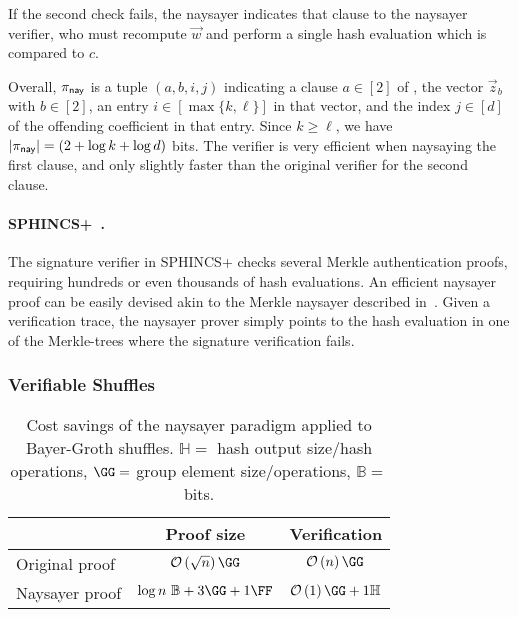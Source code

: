 If the second check fails, the naysayer indicates that clause to the naysayer verifier, who must recompute $\vec{w}$ and perform a single hash evaluation which is compared to $c$.

Overall, $\pi_{\mathsf{nay}}$ is a tuple $(a, b, i, j)$ indicating a clause $a \in [2]$ of , the vector $\vec{z}_b$ with $b \in [2]$, an entry $i \in [\max\{k,\ell\}]$ in that vector, and the index $j \in [d]$ of the offending coefficient in that entry. Since $k \geq \ell$, we have $\lvert \pi_{\mathsf{nay}} \rvert = (2+\log{k}+\log{d})$ bits. The verifier is very efficient when naysaying the first clause, and only slightly faster than the original verifier for the second clause.

\paragraph{SPHINCS+~\cite{CCS:BHKNRS19}.} The signature verifier in SPHINCS+ checks several Merkle authentication proofs, requiring hundreds or even thousands of hash evaluations. An efficient naysayer proof can be easily devised akin to the Merkle naysayer described in~. Given a verification trace, the naysayer prover simply points to the hash evaluation in one of the Merkle-trees where the signature verification fails. 

\subsubsection{Verifiable Shuffles}\label{sec:vshuffle_naysayer}

\begin{table}[h]
   \centering
    \setlength{\belowbottomsep}{6pt}
    \begin{tabular}{l c c} 
    \toprule
     & \textbf{Proof size}
     & \textbf{Verification}
     \\ \midrule
     Original proof
     & $\bigO{\sqrt{n}}\GG$
     & $\bigO{n}\GG$ 
     \\\midrule
     Naysayer proof
     & $\log{n}\ \mathbb{B}+3\GG+1\FF$ 
     & $\bigO{1}\GG + 1\mathbb{H}$
    \\ \bottomrule
    \end{tabular}
    \caption{Cost savings of the naysayer paradigm applied to Bayer-Groth shuffles. $\mathbb{H} =$ hash output size/hash operations, $\GG=$ group element size/operations, $\mathbb{B} =$ bits.}
    \label{tab:shuffle_asym}
   \end{table}

